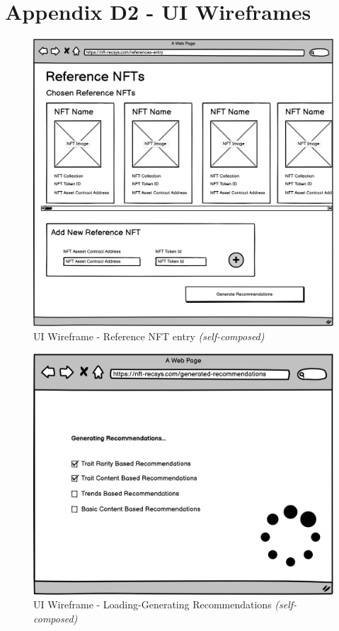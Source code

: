 \newpage
\section*{Appendix D2 - UI Wireframes}

\begin{figure}[h!]
\centering
\includegraphics[width=\textwidth]{images/appendix/UI Wireframes/Reference NFT entry.png}
\caption{UI Wireframe - Reference NFT entry \textit{(self-composed)}}
\end{figure}

\begin{figure}[h!]
\centering
\includegraphics[width=\textwidth]{images/appendix/UI Wireframes/Loading-Generating Recommendations.png}
\caption{UI Wireframe - Loading-Generating Recommendations \textit{(self-composed)}}
\end{figure}

